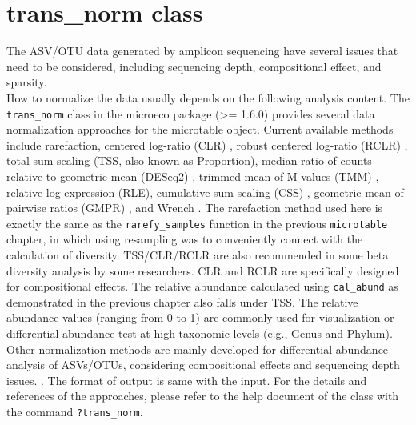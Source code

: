 \documentclass[
]{book}
\newenvironment{Shaded}{\begin{snugshade}}{\end{snugshade}}
\newcommand{\AttributeTok}[1]{\textcolor[rgb]{0.13,0.29,0.53}{#1}}
\newcommand{\FunctionTok}[1]{\textcolor[rgb]{0.13,0.29,0.53}{\textbf{#1}}}
\newcommand{\NormalTok}[1]{#1}
\newcommand{\OtherTok}[1]{\textcolor[rgb]{0.56,0.35,0.01}{#1}}
\newcommand{\SpecialCharTok}[1]{\textcolor[rgb]{0.81,0.36,0.00}{\textbf{#1}}}
\begin{document}
\section{trans\_norm class}\label{trans_norm-class}

The ASV/OTU data generated by amplicon sequencing have several issues that need to be considered, including sequencing depth, compositional effect, and sparsity.\\
How to normalize the data usually depends on the following analysis content.
The \texttt{trans\_norm} class in the microeco package (\textgreater= 1.6.0) provides several data normalization approaches for the microtable object.
Current available methods include rarefaction, centered log-ratio (CLR) \citep{Aitchison_book_1986, Greenacre_Compositional_2021},
robust centered log-ratio (RCLR) \citep{Martino_Novel_2019},
total sum scaling (TSS, also known as Proportion),
median ratio of counts relative to geometric mean (DESeq2) \citep{Love_Moderated_2014},
trimmed mean of M-values (TMM) \citep{Robinson_scaling_2010}, relative log expression (RLE),
cumulative sum scaling (CSS) \citep{Paulson_Differential_2013},
geometric mean of pairwise ratios (GMPR) \citep{Chen_GMPR_2018},
and Wrench \citep{Kumar_Analysis_2018}.
The rarefaction method used here is exactly the same as the \texttt{rarefy\_samples} function in the previous \texttt{microtable} chapter,
in which using resampling was to conveniently connect with the calculation of diversity.
TSS/CLR/RCLR are also recommended in some beta diversity analysis by some researchers.
CLR and RCLR are specifically designed for compositional effects.
The relative abundance calculated using \texttt{cal\_abund} as demonstrated in the previous chapter also falls under TSS.
The relative abundance values (ranging from 0 to 1) are commonly used for visualization or differential abundance test at high taxonomic levels (e.g., Genus and Phylum).
Other normalization methods are mainly developed for differential abundance analysis of ASVs/OTUs,
considering compositional effects and sequencing depth issues. \citep{Swift_reviewnorm_2022}.
The format of output is same with the input.
For the details and references of the approaches, please refer to the help document of the class with the command \texttt{?trans\_norm}.

\begin{Shaded}
\end{Shaded}
\end{document}
